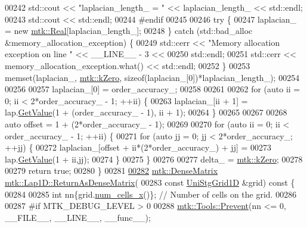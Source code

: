 \begin{DoxyCode}
00242   std::cout << \textcolor{stringliteral}{"laplacian\_length\_ = "} << laplacian\_length\_ << std::endl;
00243   std::cout << std::endl;
00244 \textcolor{preprocessor}{  #endif}
00245 
00246   \textcolor{keywordflow}{try} \{
00247     laplacian\_ = \textcolor{keyword}{new} \hyperlink{group__c01-roots_gac080bbbf5cbb5502c9f00405f894857d}{mtk::Real}[laplacian\_length\_];
00248   \} \textcolor{keywordflow}{catch} (std::bad\_alloc &memory\_allocation\_exception) \{
00249     std::cerr << \textcolor{stringliteral}{"Memory allocation exception on line "} << \_\_LINE\_\_ - 3 <<
00250       std::endl;
00251     std::cerr << memory\_allocation\_exception.what() << std::endl;
00252   \}
00253   memset(laplacian\_, \hyperlink{group__c01-roots_ga59a451a5fae30d59649bcda274fea271}{mtk::kZero}, \textcolor{keyword}{sizeof}(laplacian\_[0])*laplacian\_length\_);
00254 
00256 
00257   laplacian\_[0] = order\_accuracy\_;
00258 
00261 
00262   \textcolor{keywordflow}{for} (\textcolor{keyword}{auto} ii = 0; ii < 2*order\_accuracy\_ - 1; ++ii) \{
00263     laplacian\_[ii + 1] = lap.\hyperlink{classmtk_1_1DenseMatrix_a4b23ecbebd970b5eea915dbb50691024}{GetValue}(1 + (order\_accuracy\_ - 1), ii + 1);
00264   \}
00265 
00267 
00268   \textcolor{keyword}{auto} offset = 1 + (2*order\_accuracy\_ - 1);
00269 
00270   \textcolor{keywordflow}{for} (\textcolor{keyword}{auto} ii = 0; ii < order\_accuracy\_ - 1; ++ii) \{
00271     \textcolor{keywordflow}{for} (\textcolor{keyword}{auto} jj = 0; jj < 2*order\_accuracy\_; ++jj) \{
00272       laplacian\_[offset + ii*(2*order\_accuracy\_) + jj] =
00273         lap.\hyperlink{classmtk_1_1DenseMatrix_a4b23ecbebd970b5eea915dbb50691024}{GetValue}(1 + ii,jj);
00274     \}
00275   \}
00276 
00277   delta\_ = \hyperlink{group__c01-roots_ga59a451a5fae30d59649bcda274fea271}{mtk::kZero};
00278 
00279   \textcolor{keywordflow}{return} \textcolor{keyword}{true};
00280 \}
00281 
\hypertarget{mtk__lap__1d_8cc_source_l00282}{}\hyperlink{classmtk_1_1Lap1D_aaea34a17b0879e05eb4109645a2ba8f4}{00282} \hyperlink{classmtk_1_1DenseMatrix}{mtk::DenseMatrix} \hyperlink{classmtk_1_1Lap1D_aaea34a17b0879e05eb4109645a2ba8f4}{mtk::Lap1D::ReturnAsDenseMatrix}(
00283   \textcolor{keyword}{const} \hyperlink{classmtk_1_1UniStgGrid1D}{UniStgGrid1D} &grid)\textcolor{keyword}{ const }\{
00284 
00285   \textcolor{keywordtype}{int} nn\{grid.\hyperlink{classmtk_1_1UniStgGrid1D_af1b3729d8afa07be5b2775ed68015b80}{num\_cells\_x}()\};  \textcolor{comment}{// Number of cells on the grid.}
00286 
00287 \textcolor{preprocessor}{  #if MTK\_DEBUG\_LEVEL > 0}
00288   \hyperlink{classmtk_1_1Tools_a332324c6f25e66be9dff48c5987a3b9f}{mtk::Tools::Prevent}(nn <= 0, \_\_FILE\_\_, \_\_LINE\_\_, \_\_func\_\_);

\end{DoxyCode}
